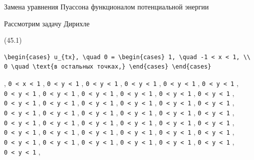 \documentclass[
  ukrainian,
]{article}
\begin{document}
Замена уравнения Пуассона функционалом потенциальной энергии

Рассмотрим задачу Дирихле

(45.1)

\begin{verbatim}
\begin{cases} u_{tx}, \quad 0 = \begin{cases} 1, \quad -1 < x < 1, \\ 0 \quad \text{в остальных точках,} \end{cases} \end{cases}
\end{verbatim}

, \texttt{0\ \textless{}\ x\ \textless{}\ 1} ,
\texttt{0\ \textless{}\ y\ \textless{}\ 1} ,
\texttt{0\ \textless{}\ y\ \textless{}\ 1} ,
\texttt{0\ \textless{}\ y\ \textless{}\ 1} ,
\texttt{0\ \textless{}\ y\ \textless{}\ 1} ,
\texttt{0\ \textless{}\ y\ \textless{}\ 1} ,
\texttt{0\ \textless{}\ y\ \textless{}\ 1} ,
\texttt{0\ \textless{}\ y\ \textless{}\ 1} ,
\texttt{0\ \textless{}\ y\ \textless{}\ 1} ,
\texttt{0\ \textless{}\ y\ \textless{}\ 1} ,
\texttt{0\ \textless{}\ y\ \textless{}\ 1} ,
\texttt{0\ \textless{}\ y\ \textless{}\ 1} ,
\texttt{0\ \textless{}\ y\ \textless{}\ 1} ,
\texttt{0\ \textless{}\ y\ \textless{}\ 1} ,
\texttt{0\ \textless{}\ y\ \textless{}\ 1} ,
\texttt{0\ \textless{}\ y\ \textless{}\ 1} ,
\texttt{0\ \textless{}\ y\ \textless{}\ 1} ,
\texttt{0\ \textless{}\ y\ \textless{}\ 1} ,
\texttt{0\ \textless{}\ y\ \textless{}\ 1} ,
\texttt{0\ \textless{}\ y\ \textless{}\ 1} ,
\texttt{0\ \textless{}\ y\ \textless{}\ 1} ,
\texttt{0\ \textless{}\ y\ \textless{}\ 1} ,
\texttt{0\ \textless{}\ y\ \textless{}\ 1} ,
\texttt{0\ \textless{}\ y\ \textless{}\ 1} ,
\texttt{0\ \textless{}\ y\ \textless{}\ 1} ,
\texttt{0\ \textless{}\ y\ \textless{}\ 1} ,
\texttt{0\ \textless{}\ y\ \textless{}\ 1} ,
\texttt{0\ \textless{}\ y\ \textless{}\ 1} ,
\texttt{0\ \textless{}\ y\ \textless{}\ 1} ,
\texttt{0\ \textless{}\ y\ \textless{}\ 1} ,
\texttt{0\ \textless{}\ y\ \textless{}\ 1} ,
\texttt{0\ \textless{}\ y\ \textless{}\ 1} ,
\texttt{0\ \textless{}\ y\ \textless{}\ 1} ,
\texttt{0\ \textless{}\ y\ \textless{}\ 1} ,
\texttt{0\ \textless{}\ y\ \textless{}\ 1} ,
\texttt{0\ \textless{}\ y\ \textless{}\ 1} ,
\texttt{0\ \textless{}\ y\ \textless{}\ 1} ,
\texttt{0\ \textless{}\ y\ \textless{}\ 1} ,
\texttt{0\ \textless{}\ y\ \textless{}\ 1} ,
\texttt{0\ \textless{}\ y\ \textless{}\ 1} ,
\texttt{0\ \textless{}\ y\ \textless{}\ 1} ,
\texttt{0\ \textless{}\ y\ \textless{}\ 1} ,
\texttt{0\ \textless{}\ y\ \textless{}\ 1} ,
\end{document}
